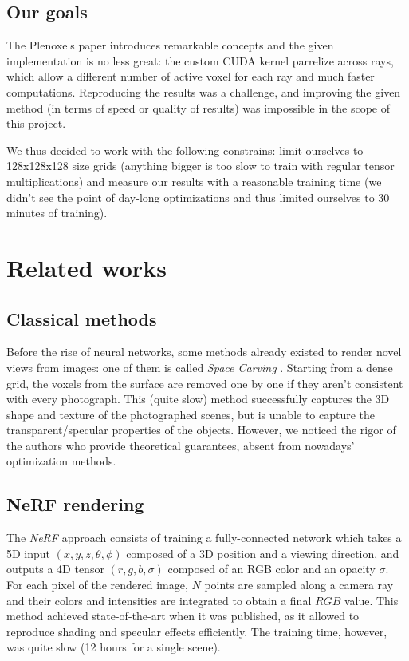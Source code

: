 \documentclass{article}
\begin{document}
\subsection{Our goals}


The Plenoxels paper introduces remarkable concepts and the given implementation is no less great: the custom CUDA kernel parrelize across rays, which allow a different number of active voxel for each ray and much faster computations. Reproducing the results was a challenge, and improving the given method (in terms of speed or quality of results) was impossible in the scope of this project.

We thus decided to work with the following constrains: limit ourselves to 128x128x128 size grids (anything bigger is too slow to train with regular tensor multiplications) and measure our results with a reasonable training time (we didn't see the point of day-long optimizations and thus limited ourselves to 30 minutes of training).

\section{Related works}\label{sec:relat}



\subsection{Classical methods}

Before the rise of neural networks, some methods already existed to render novel views from images: one of them is called \textit{Space Carving} \cite{spacecarving}. Starting from a dense grid, the voxels from the surface are removed one by one if they aren't consistent with every photograph. This (quite slow) method successfully captures the 3D shape and texture of the photographed scenes, but is unable to capture the transparent/specular properties of the objects. However, we noticed the rigor of the authors who provide theoretical guarantees, absent from nowadays' optimization methods.

\subsection{NeRF rendering}

The \textit{NeRF} \cite{nerf} approach consists of training a fully-connected network which takes a 5D input $(x,y,z,\theta,\phi)$ composed of a 3D position and a viewing direction, and outputs a 4D tensor $(r, g, b, \sigma)$ composed of an RGB color and an opacity $\sigma$. For each pixel of the rendered image, $N$ points are sampled along a camera ray and their colors and intensities are integrated to obtain a final $RGB$ value. This method achieved state-of-the-art when it was published, as it allowed to reproduce shading and specular effects efficiently. The training time, however, was quite slow (12 hours for a single scene).
\end{document}
